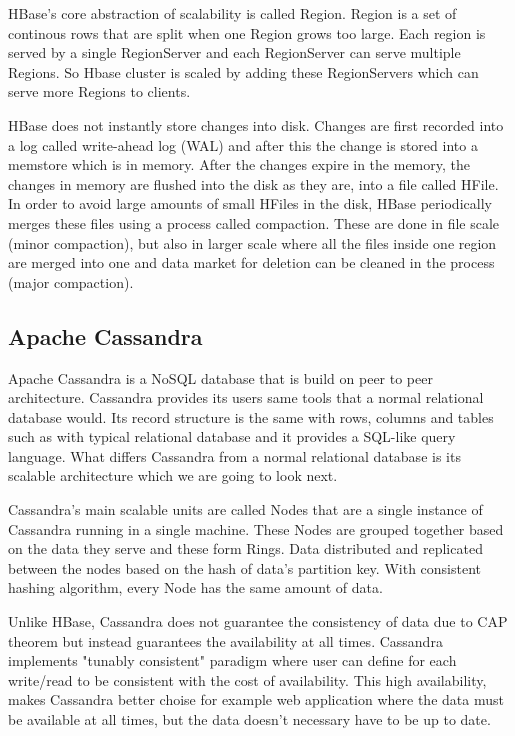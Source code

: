 HBase's core abstraction of scalability is called Region.
Region is a set of continous rows that are split when one Region grows too large.
Each region is served by a single RegionServer and each RegionServer can serve multiple Regions.
So Hbase cluster is scaled by adding these RegionServers which can serve more Regions to clients. \cite{george}

HBase does not instantly store changes into disk. 
Changes are first recorded into a log called write-ahead log (WAL) and after this the change is stored into a memstore which is in memory.
After the changes expire in the memory, the changes in memory are flushed into the disk as they are, into a file called HFile. 
In order to avoid large amounts of small HFiles in the disk, HBase periodically merges these files using a process called compaction.
These are done in file scale (minor compaction), but also in larger scale where all the files inside one region are merged into one and data market for deletion can be cleaned in the process (major compaction). \cite{george}

\subsection{Apache Cassandra}

Apache Cassandra is a NoSQL database that is build on peer to peer architecture.
Cassandra provides its users same tools that a normal relational database would.
Its record structure is the same with rows, columns and tables such as with typical relational database and it provides a SQL-like query language.
What differs Cassandra from a normal relational database is its scalable architecture which we are going to look next. \cite{yarabarla}

Cassandra's main scalable units are called Nodes that are a single instance of Cassandra running in a single machine.
These Nodes are grouped together based on the data they serve and these form Rings.
Data distributed and replicated between the nodes based on the hash of data's partition key.
With consistent hashing algorithm, every Node has the same amount of data. \cite{neeraj}

Unlike HBase, Cassandra does not guarantee the consistency of data due to CAP theorem but instead guarantees the availability at all times.
Cassandra implements "tunably consistent" paradigm where user can define for each write/read to be consistent with the cost of availability.
This high availability, makes Cassandra better choise for example web application where the data must be available at all times, but the data doesn't necessary have to be up to date. \cite{neeraj}



